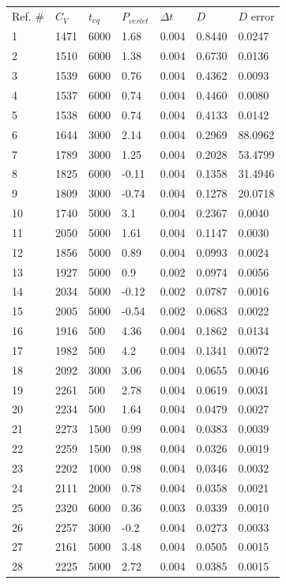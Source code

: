 \documentclass{article}
\begin{document}
\begin{center}
\begin{tabular}{lllllll}
Ref. \# & $C_V$ & $t_{eq}$ & $P_{verlet}$ & $\Delta t$ & $D$ & $D$ error\\
1 & 1471 & 6000 & 1.68 & 0.004 & 0.8440 & 0.0247\\
2 & 1510 & 6000 & 1.38 & 0.004 & 0.6730 & 0.0136\\
3 & 1539 & 6000 & 0.76 & 0.004 & 0.4362 & 0.0093\\
4 & 1537 & 6000 & 0.74 & 0.004 & 0.4460 & 0.0080\\
5 & 1538 & 6000 & 0.74 & 0.004 & 0.4133 & 0.0142\\
6 & 1644 & 3000 & 2.14 & 0.004 & 0.2969 & 88.0962\\
7 & 1789 & 3000 & 1.25 & 0.004 & 0.2028 & 53.4799\\
8 & 1825 & 6000 & -0.11 & 0.004 & 0.1358 & 31.4946\\
9 & 1809 & 3000 & -0.74 & 0.004 & 0.1278 & 20.0718\\
10 & 1740 & 5000 & 3.1 & 0.004 & 0.2367 & 0.0040\\
11 & 2050 & 5000 & 1.61 & 0.004 & 0.1147 & 0.0030\\
12 & 1856 & 5000 & 0.89 & 0.004 & 0.0993 & 0.0024\\
13 & 1927 & 5000 & 0.9 & 0.002 & 0.0974 & 0.0056\\
14 & 2034 & 5000 & -0.12 & 0.002 & 0.0787 & 0.0016\\
15 & 2005 & 5000 & -0.54 & 0.002 & 0.0683 & 0.0022\\
16 & 1916 & 500 & 4.36 & 0.004 & 0.1862 & 0.0134\\
17 & 1982 & 500 & 4.2 & 0.004 & 0.1341 & 0.0072\\
18 & 2092 & 3000 & 3.06 & 0.004 & 0.0655 & 0.0046\\
19 & 2261 & 500 & 2.78 & 0.004 & 0.0619 & 0.0031\\
20 & 2234 & 500 & 1.64 & 0.004 & 0.0479 & 0.0027\\
21 & 2273 & 1500 & 0.99 & 0.004 & 0.0383 & 0.0039\\
22 & 2259 & 1500 & 0.98 & 0.004 & 0.0326 & 0.0019\\
23 & 2202 & 1000 & 0.98 & 0.004 & 0.0346 & 0.0032\\
24 & 2111 & 2000 & 0.78 & 0.004 & 0.0358 & 0.0021\\
25 & 2320 & 6000 & 0.36 & 0.003 & 0.0339 & 0.0010\\
26 & 2257 & 3000 & -0.2 & 0.004 & 0.0273 & 0.0033\\
27 & 2161 & 5000 & 3.48 & 0.004 & 0.0505 & 0.0015\\
28 & 2225 & 5000 & 2.72 & 0.004 & 0.0385 & 0.0015
\end{tabular}
\end{center}
\end{document}
